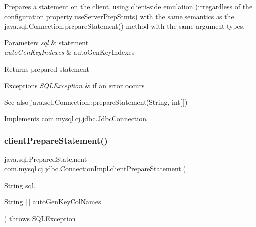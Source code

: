 Prepares a statement on the client, using client-\/side emulation (irregardless of the configuration property \textquotesingle{}use\+Server\+Prep\+Stmts\textquotesingle{}) with the same semantics as the java.\+sql.\+Connection.\+prepare\+Statement() method with the same argument types.


\begin{DoxyParams}{Parameters}
{\em sql} & statement \\
\hline
{\em auto\+Gen\+Key\+Indexes} & auto\+Gen\+Key\+Indexes \\
\hline
\end{DoxyParams}
\begin{DoxyReturn}{Returns}
prepared statement 
\end{DoxyReturn}

\begin{DoxyExceptions}{Exceptions}
{\em S\+Q\+L\+Exception} & if an error occurs\\
\hline
\end{DoxyExceptions}
\begin{DoxySeeAlso}{See also}
java.\+sql.\+Connection\+::prepare\+Statement(\+String, int\mbox{[}$\,$\mbox{]}) 
\end{DoxySeeAlso}


Implements \mbox{\hyperlink{interfacecom_1_1mysql_1_1cj_1_1jdbc_1_1_jdbc_connection_a11927338ef48e164fdd8444b6b273162}{com.\+mysql.\+cj.\+jdbc.\+Jdbc\+Connection}}.

\mbox{\label{classcom_1_1mysql_1_1cj_1_1jdbc_1_1_connection_impl_ade3184b1d304b0ab3a5a0f5d2f8f0539}} 
\subsubsection{\texorpdfstring{client\+Prepare\+Statement()}{clientPrepareStatement()}\hspace{0.1cm}{\footnotesize\ttfamily [5/6]}}
{\footnotesize\ttfamily java.\+sql.\+Prepared\+Statement com.\+mysql.\+cj.\+jdbc.\+Connection\+Impl.\+client\+Prepare\+Statement (\begin{DoxyParamCaption}\item[{String}]{sql,  }\item[{String \mbox{[}$\,$\mbox{]}}]{auto\+Gen\+Key\+Col\+Names }\end{DoxyParamCaption}) throws S\+Q\+L\+Exception}

